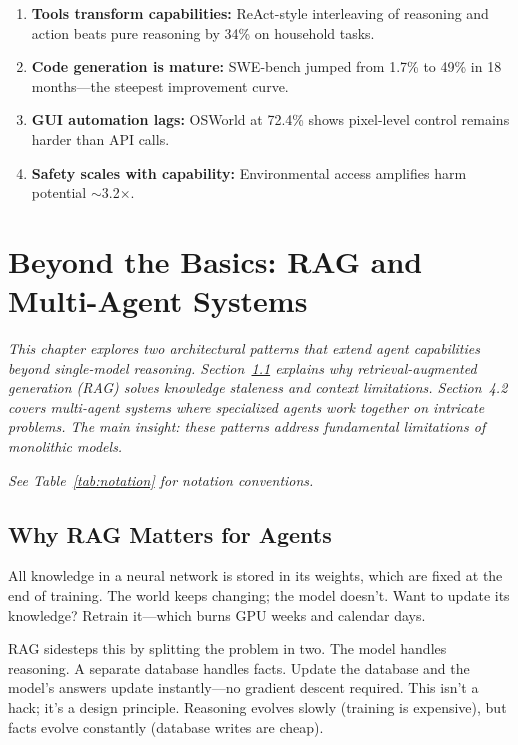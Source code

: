 \documentclass[12pt,a4paper]{report}
\theoremstyle{definition}
\begin{document}
\begin{tcolorbox}[colback=green!5!white, colframe=green!60!black, title=\textbf{Chapter 3 Key Takeaways}]
\begin{enumerate}
    \item \textbf{Tools transform capabilities:} ReAct-style interleaving of reasoning and action beats pure reasoning by 34\% on household tasks.
    \item \textbf{Code generation is mature:} SWE-bench jumped from 1.7\% to 49\% in 18 months---the steepest improvement curve.
    \item \textbf{GUI automation lags:} OSWorld at 72.4\% shows pixel-level control remains harder than API calls.
    \item \textbf{Safety scales with capability:} Environmental access amplifies harm potential $\sim$3.2$\times$.
\end{enumerate}
\end{tcolorbox}

\chapter{Beyond the Basics: RAG and Multi-Agent Systems}
\label{ch:advancedarch}

\textit{This chapter explores two architectural patterns that extend agent capabilities beyond single-model reasoning. Section~\ref{sec:rag-matters} explains why retrieval-augmented generation (RAG) solves knowledge staleness and context limitations. Section~4.2 covers multi-agent systems where specialized agents work together on intricate problems. The main insight: these patterns address fundamental limitations of monolithic models.
}

\vspace{0.3cm}
\noindent\textit{See Table~\ref{tab:notation} for notation conventions.}

\section{Why RAG Matters for Agents}
\label{sec:rag-matters}
All knowledge in a neural network is stored in its weights, which are fixed at the end of training. The world keeps changing; the model doesn't. Want to update its knowledge? Retrain it---which burns GPU weeks and calendar days.

RAG sidesteps this by splitting the problem in two. The model handles reasoning. A separate database handles facts. Update the database and the model's answers update instantly---no gradient descent required. This isn't a hack; it's a design principle. Reasoning evolves slowly (training is expensive), but facts evolve constantly (database writes are cheap).
\end{document}
